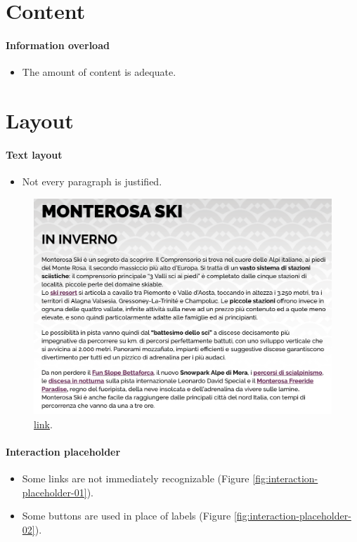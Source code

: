 \documentclass[a4paper, 11pt, parskip=half, headsepline]{scrreprt}
\begin{document}
\section{Content}

\paragraph{Information overload}
\begin{itemize}
    \item The amount of content is adequate.
\end{itemize}

 
\section{Layout}

\paragraph{Text layout}
\begin{itemize}
    \item Not every paragraph is justified.
\end{itemize}

\begin{figure}[H]
        \centering
        \includegraphics[width=0.5\linewidth, keepaspectratio]{textlayout1.png}
        \caption{\href{https://www.visitmonterosa.com/monterosa-ski/}{link}.}
        \label{fig:text-layout-01}
\end{figure}

\paragraph{Interaction placeholder}
\begin{itemize}
    \item Some links are not immediately recognizable (Figure \ref{fig:interaction-placeholder-01}).
    \item Some buttons are used in place of labels (Figure \ref{fig:interaction-placeholder-02}).
\end{itemize}
\end{document}
